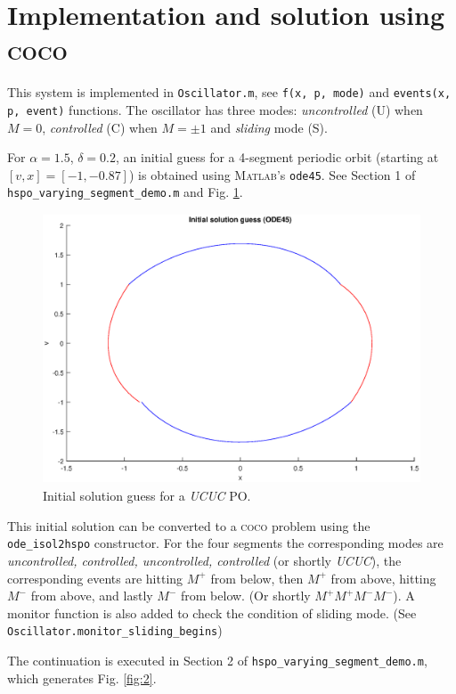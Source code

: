 \documentclass{article}
\begin{document}
\section{Implementation and solution using \textsc{coco}}
This system is implemented in \texttt{Oscillator.m}, see \texttt{f(x, p, mode)} and \texttt{events(x, p, event)} functions. The oscillator has three modes: \emph{uncontrolled} (U) when $M=0$, \emph{controlled} (C) when $M=\pm1$ and \emph{sliding} mode (S).

For $\alpha = 1.5$, $\delta = 0.2$, an initial guess for a 4-segment periodic orbit (starting at $[v, x]= [-1, -0.87]$) is obtained using \textsc{Matlab}'s \texttt{ode45}. See Section 1 of \texttt{hspo\_varying\_segment\_demo.m} and Fig. \ref{fig:1}.

\begin{figure}[h!]
	\centering 
	\includegraphics[height=8cm]{fig1}
	\caption{Initial solution guess for a \emph{UCUC} PO. \label{fig:1}}
\end{figure}

\newpage 
This initial solution can be converted to a \textsc{coco} problem using the \texttt{ode\_isol2hspo} constructor. For the four segments the corresponding modes are \emph{uncontrolled, controlled, uncontrolled, controlled} (or shortly \emph{UCUC}), the corresponding events are hitting $M^+$ from below, then $M^+$ from above, hitting $M^-$ from above, and lastly $M^-$ from below. (Or shortly $M^+M^+M^-M^-$). A monitor function is also added to check the condition of sliding mode. (See \texttt{Oscillator.monitor\_sliding\_begins})

The continuation is executed in Section 2 of \texttt{hspo\_varying\_segment\_demo.m}, which generates Fig. \ref{fig:2}. 
\end{document}
